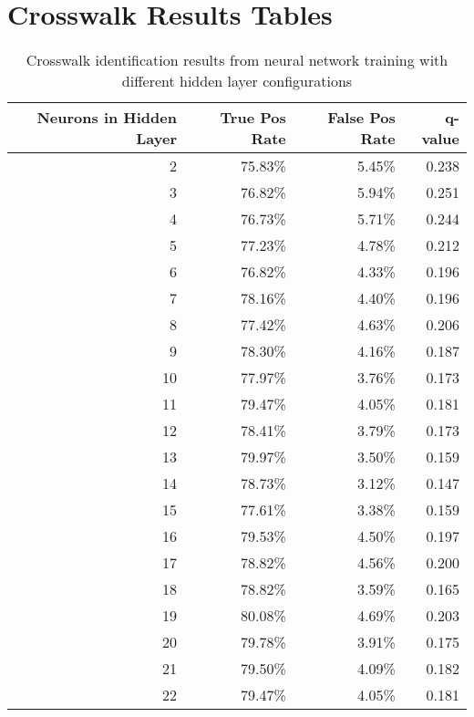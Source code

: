 \chapter{Crosswalk Results Tables}
    \begin{longtable}{|r|r|r|r|}
    \caption{Crosswalk identification results from neural network training with different hidden layer configurations}
    \label{tab:NN-HiddenLayersResultsAPP}\\
    \hline
    Neurons in Hidden Layer & True Pos Rate & False Pos Rate & q-value \bigstrut\\
    \hline
    2     & 75.83\% & 5.45\% & 0.238 \bigstrut\\
    \hline
    3     & 76.82\% & 5.94\% & 0.251 \bigstrut\\
    \hline
    4     & 76.73\% & 5.71\% & 0.244 \bigstrut\\
    \hline
    5     & 77.23\% & 4.78\% & 0.212 \bigstrut\\
    \hline
    6     & 76.82\% & 4.33\% & 0.196 \bigstrut\\
    \hline
    7     & 78.16\% & 4.40\% & 0.196 \bigstrut\\
    \hline
    8     & 77.42\% & 4.63\% & 0.206 \bigstrut\\
    \hline
    9     & 78.30\% & 4.16\% & 0.187 \bigstrut\\
    \hline
    10    & 77.97\% & 3.76\% & 0.173 \bigstrut\\
    \hline
    11    & 79.47\% & 4.05\% & 0.181 \bigstrut\\
    \hline
    12    & 78.41\% & 3.79\% & 0.173 \bigstrut\\
    \hline
    13    & 79.97\% & 3.50\% & 0.159 \bigstrut\\
    \hline
    14    & 78.73\% & 3.12\% & 0.147 \bigstrut\\
    \hline
    15    & 77.61\% & 3.38\% & 0.159 \bigstrut\\
    \hline
    16    & 79.53\% & 4.50\% & 0.197 \bigstrut\\
    \hline
    17    & 78.82\% & 4.56\% & 0.200 \bigstrut\\
    \hline
    18    & 78.82\% & 3.59\% & 0.165 \bigstrut\\
    \hline
    19    & 80.08\% & 4.69\% & 0.203 \bigstrut\\
    \hline
    20    & 79.78\% & 3.91\% & 0.175 \bigstrut\\
    \hline
    21    & 79.50\% & 4.09\% & 0.182 \bigstrut\\
    \hline
    22    & 79.47\% & 4.05\% & 0.181 \bigstrut\\
    \hline
    \end{longtable}



